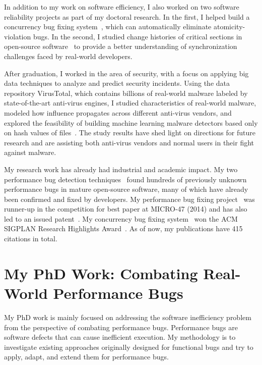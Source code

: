 \documentclass[10pt]{article}
\begin{document}
In addition to my work on software efficiency, I also worked on two 
software reliability projects as part of my doctoral research. In the first, 
I helped build a concurrency bug fixing system~\cite{jin11afix}, 
which can automatically eliminate atomicity-violation bugs.
In the second, I studied change histories of critical sections in open-source software~\cite{Gu15FSE} 
to provide a better understanding of synchronization challenges faced by real-world developers. 

After graduation, I worked in the area of security, 
with a focus on applying big data techniques to analyze and predict security incidents. 
Using the data repository VirusTotal, 
which contains billions of real-world malware labeled by state-of-the-art anti-virus engines, 
I studied characteristics of real-world malware, 
modeled how influence propagates across different anti-virus vendors, 
and explored the feasibility of building machine learning malware detectors 
based only on hash values of files~\cite{Song16ApSys,Song17EuroSys}. 
The study results have shed light on directions for future research  
and are assisting both anti-virus vendors and normal users in their fight against malware.

My research work has already had industrial and academic impact. 
My two performance bug detection techniques~\cite{jin12perfbug, Nistor13ICSE} 
found hundreds of previously unknown performance bugs in mature open-source software, 
many of which have already been confirmed and fixed by developers. 
My performance bug fixing project~\cite{Song14MICRO} was runner-up in the competition for best paper at MICRO-47 (2014)
and has also led to an issued patent~\cite{comppatent}.
My concurrency bug fixing system~\cite{jin11afix} won the ACM SIGPLAN Research Highlights Award~\cite{afixnom}. 
As of now, my publications have 415 citations in total. 

\vspace{-.1in}
\section{My PhD Work: Combating Real-World Performance Bugs}

My PhD work is mainly focused on addressing the software 
inefficiency problem from the perspective of combating performance bugs. 
Performance bugs are software defects that can cause inefficient execution. 
My methodology is to investigate existing approaches originally designed for functional bugs
and try to apply, adapt, and extend them for performance bugs. 
\end{document}
